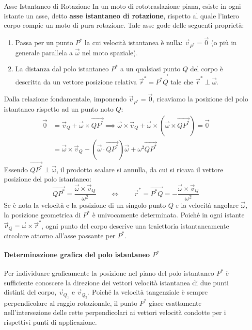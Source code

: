 \begin{definizione}{Asse Istantaneo di Rotazione}
In un moto di rototraslazione piana, esiste in ogni istante un asse, detto \textbf{asse istantaneo di rotazione}, rispetto al quale l'intero corpo compie un moto di pura rotazione. Tale asse gode delle seguenti proprietà:
\begin{enumerate}
    \item Passa per un punto $P^*$ la cui velocità istantanea è nulla: $\vec{v}_{P^*} = \vec{0}$ (o più in generale parallela a $\vec{\omega}$ nel moto spaziale).
    \item La distanza dal polo istantaneo $P^*$ a un qualsiasi punto $Q$ del corpo è descritta da un vettore posizione relativa $\vec{r}^* = \overrightarrow{P^*Q}$ tale che $\vec{r}^* \perp \vec{\omega}$.
\end{enumerate}
\end{definizione}

Dalla relazione fondamentale, imponendo $\vec{v}_{P^*} = \vec{0}$, ricaviamo la posizione del polo istantaneo rispetto ad un punto noto $Q$:
\begin{align*}
    \vec{0} &= \vec{v}_Q + \vec{\omega} \times \overrightarrow{QP^*} \implies \vec{\omega} \times \vec{v}_Q + \vec{\omega} \times (\vec{\omega} \times \overrightarrow{QP^*}) = \vec{0} \\
    &= \vec{\omega} \times \vec{v}_Q - (\vec{\omega} \cdot \overrightarrow{QP^*})\vec{\omega} + \omega^2 \overrightarrow{QP^*}
\end{align*}
Essendo $\overrightarrow{QP^*} \perp \vec{\omega}$, il prodotto scalare si annulla, da cui si ricava il vettore posizione del polo istantaneo:
\begin{equation}
    \overrightarrow{QP^*} = \frac{\vec{\omega} \times \vec{v}_Q}{\omega^2} \qquad \iff \qquad \vec{r}^* = \overrightarrow{P^*Q} = -\frac{\vec{\omega} \times \vec{v}_Q}{\omega^2}
\end{equation}
Se è nota la velocità e la posizione di un singolo punto $Q$ e la velocità angolare $\vec{\omega}$, la posizione geometrica di $P^*$ è univocamente determinata. Poiché in ogni istante $\vec{v}_Q = \vec{\omega} \times \vec{r}^*$, ogni punto del corpo descrive una traiettoria istantaneamente circolare attorno all'asse passante per $P^*$.

\paragraph{Determinazione grafica del polo istantaneo $P^*$}
Per individuare graficamente la posizione nel piano del polo istantaneo $P^*$ è sufficiente conoscere la direzione dei vettori velocità istantanea di due punti distinti del corpo, $\vec{v}_{Q_1}$ e $\vec{v}_{Q_2}$. Poiché la velocità tangenziale è sempre perpendicolare al raggio rotazionale, il punto $P^*$ giace esattamente nell'intersezione delle rette perpendicolari ai vettori velocità condotte per i rispettivi punti di applicazione.

